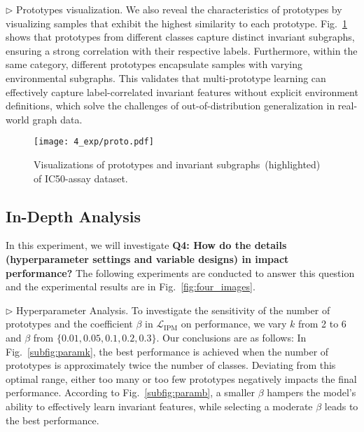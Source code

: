 

\noindent$\rhd$ \textsf{Prototypes visualization.} We also reveal the characteristics of prototypes by visualizing samples that exhibit the highest similarity to each prototype. Fig.~\ref{fig:proto} shows that prototypes from different classes capture distinct invariant subgraphs, ensuring a strong correlation with their respective labels. Furthermore, within the same category, different prototypes encapsulate samples with varying environmental subgraphs. This validates that multi-prototype learning can effectively capture label-correlated invariant features without explicit environment definitions, which solve the challenges of out-of-distribution generalization in real-world graph data.
\begin{figure}[t]
    \centering

    \texttt{[image: 4\_exp/proto.pdf]}

    \caption{Visualizations of prototypes and invariant subgraphs~(highlighted) of IC50-assay dataset.}
    \label{fig:proto}
\vspace{-5mm}
\end{figure}

\subsection{In-Depth Analysis}
In this experiment, we will investigate \textbf{Q4: How do the details (hyperparameter settings and variable designs) in \ourmethod impact performance?} The following experiments are conducted to answer this question and the experimental results are in Fig.~\ref{fig:four_images}.

\noindent$\rhd$ \textsf{Hyperparameter Analysis.}
To investigate the sensitivity of the number of prototypes and the coefficient $\beta$ in $\mathcal{L}_{\mathrm{IPM}}$ on performance, we vary $k$ from 2 to 6 and $\beta$ from $\{0.01, 0.05, 0.1, 0.2, 0.3\}$. Our conclusions are as follows:  In Fig.~\ref{subfig:paramk}, the best performance is achieved when the number of prototypes is approximately twice the number of classes. Deviating from this optimal range, either too many or too few prototypes negatively impacts the final performance.  According to Fig.~\ref{subfig:paramb}, a smaller $\beta$  hampers the model’s ability to effectively learn invariant features, while selecting a moderate $\beta$ leads to the best performance.
 

